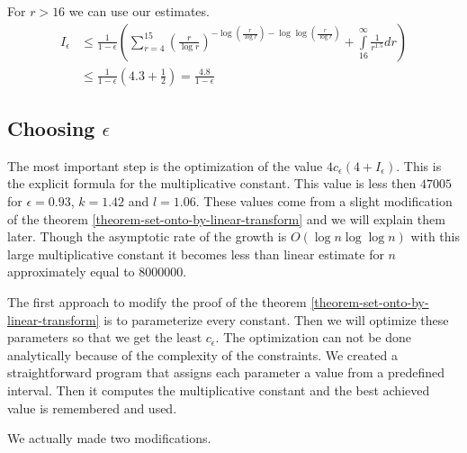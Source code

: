 For $r > 16$ we can use our estimates.
\begin{displaymath}
\begin{split}
I_{\epsilon} 
	& \leq \frac{1}{1 - \epsilon} \left( \displaystyle \sum_{r = 4}^{15} \left(\frac{r}{\log r}\right)^{-\log \left(\frac{r}{\log r}\right) - \log \log \left(\frac{r}{\log r}\right)} + \int\limits_{16}^\infty \frac{1}{r^{1.5}} dr \right) \\
	& \leq \frac{1}{1 - \epsilon} \left(4.3 + \frac{1}{2}\right) = \frac{4.8}{1-\epsilon}
\end{split}
\end{displaymath}

\subsection{Choosing $\epsilon$}
The most important step is the optimization of the value $4 c_\epsilon (4 + I_{\epsilon})$. This is the explicit formula for the multiplicative constant. This value is less then $47 005$ for $\epsilon = 0.93$, $k = 1.42$ and $l = 1.06$. These values come from a slight modification of the theorem \ref{theorem-set-onto-by-linear-transform} and we will explain them later. Though the asymptotic rate of the growth is $O(\log n \log \log n)$ with this large multiplicative constant it becomes less than linear estimate for $n$ approximately equal to $8 000 000$.

The first approach to modify the proof of the theorem \ref{theorem-set-onto-by-linear-transform} is to parameterize every constant. Then we will optimize these parameters so that we get the least $c_{\epsilon}$. The optimization can not be done analytically because of the complexity of the constraints. We created a straightforward program that assigns each parameter a value from a predefined interval. Then it computes the multiplicative constant and the best achieved value is remembered and used.

We actually made two modifications. 

